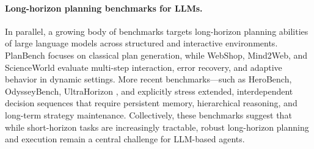 
\paragraph{Long-horizon planning benchmarks for LLMs.}
In parallel, a growing body of benchmarks targets long-horizon planning abilities of large language models across structured and interactive environments. PlanBench focuses on classical plan generation, while WebShop, Mind2Web, and ScienceWorld \citep{mind2web, scienceworldagentsmarter5th, 3webshopscalablerealworldweb} evaluate multi-step interaction, error recovery, and adaptive behavior in dynamic settings. More recent benchmarks---such as HeroBench, OdysseyBench, UltraHorizon \citep{utltabench, herobenchbenchmarklonghorizonplanning, odysseybenchevaluatingllmagents}, and explicitly stress extended, interdependent decision sequences that require persistent memory, hierarchical reasoning, and long-term strategy maintenance. Collectively, these benchmarks suggest that while short-horizon tasks are increasingly tractable, robust long-horizon planning and execution remain a central challenge for LLM-based agents.

